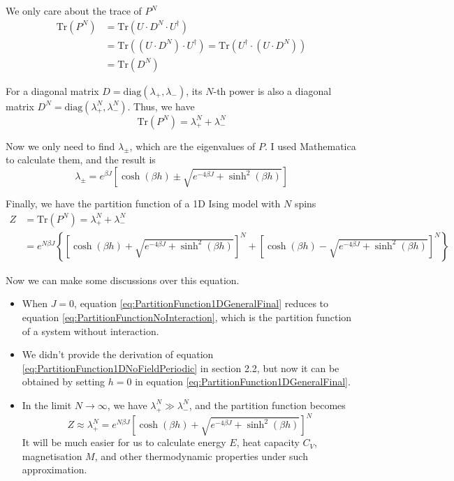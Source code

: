 \documentclass[11pt]{article}
\begin{document}
	We only care about the trace of $P^N$
	\begin{equation} \label{eq:MatrixPNTrace}
		\begin{aligned}
			\mathrm{Tr}(P^N) &= \mathrm{Tr}(U \cdot D^N \cdot U^\dagger) \\
			&= \mathrm{Tr}((U \cdot D^N) \cdot U^\dagger) = \mathrm{Tr}(U^\dagger \cdot (U \cdot D^N)) \\
			&= \mathrm{Tr}(D^N)
		\end{aligned}
	\end{equation}

	For a diagonal matrix $D = \mathrm{diag}(\lambda_+, \lambda_-)$, 
	its $N$-th power is also a diagonal matrix $D^N = \mathrm{diag}(\lambda_+^N, \lambda_-^N)$.
	Thus, we have
	\begin{equation} \label{eq:MatrixPNTraceDiagonal}
		\mathrm{Tr}(P^N) = \lambda_+^N + \lambda_-^N
	\end{equation}

	Now we only need to find $\lambda_\pm$, which are the eigenvalues of $P$.
	I used Mathematica to calculate them, and the result is
	\begin{equation} \label{eq:MatrixPEigenvalues}
		\lambda_\pm = e^{\beta J} \left[\cosh(\beta h) \pm \sqrt{e^{-4\beta J}+\sinh^2(\beta h)}\right]
	\end{equation}

	Finally, we have the partition function of a 1D Ising model with $N$ spins
	\begin{equation} \label{eq:PartitionFunction1DGeneralFinal}
		\begin{aligned}
			Z &= \mathrm{Tr}(P^N) = \lambda_+^N + \lambda_-^N \\
			&= e^{N \beta J} \left\{\left[\cosh(\beta h) + \sqrt{e^{-4\beta J}+\sinh^2(\beta h)}\right]^N
			 + \left[\cosh(\beta h) - \sqrt{e^{-4\beta J}+\sinh^2(\beta h)}\right]^N\right\}
		\end{aligned}
	\end{equation}

	Now we can make some discussions over this equation.
	\begin{itemize}
		\item When $J = 0$, equation \eqref{eq:PartitionFunction1DGeneralFinal} reduces to equation \eqref{eq:PartitionFunctionNoInteraction},
			which is the partition function of a system without interaction.
		\item We didn't provide the derivation of equation \eqref{eq:PartitionFunction1DNoFieldPeriodic} in section 2.2,
			but now it can be obtained by setting $h = 0$ in equation \eqref{eq:PartitionFunction1DGeneralFinal}.
		\item In the limit $N \to \infty$, we have $\lambda_+^N \gg \lambda_-^N$, and the partition function becomes
			\begin{equation} \label{eq:PartitionFunction1DGeneralLimit}
				Z \approx \lambda_+^N = e^{N \beta J} \left[\cosh(\beta h) + \sqrt{e^{-4\beta J}+\sinh^2(\beta h)}\right]^N
			\end{equation}
		It will be much easier for us to calculate energy $E$, heat capacity $C_V$, magnetisation $M$, 
		and other thermodynamic properties under such approximation.
	\end{itemize}
\end{document}
